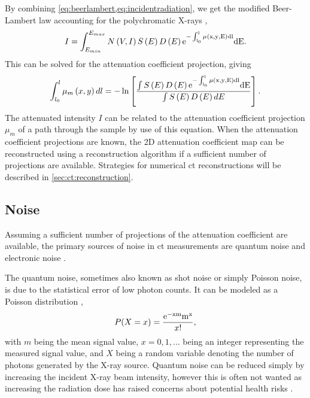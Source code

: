 By combining \cref{eq:beerlambert,eq:incidentradiation}, we get the modified Beer-Lambert law accounting for the polychromatic X-rays \cite{doi:10.1063/1.4950807}, 
\begin{equation}
    I = \int_{E_{min}}^{E_{max}}N\left(V,I\right)S\left(E\right)D\left(E\right)\rm{e}^{-\int_{l_0}^{l}\mu\left(x,y,E\right)dl}dE.
\end{equation}
This can be solved for the attenuation coefficient projection, giving \cite{doi:10.1063/1.4950807}
\begin{equation}
    \label{eq:ctattenuationcoefficient}
    \int_{l_0}^{l} \mu_m\left(x,y\right)dl = -\ln\left[\frac{\int S\left(E\right) D\left(E\right)\rm{e}^{-\int_{l_0}^{l}\mu\left(x,y,E\right)dl} dE }{ \int S\left(E\right) D\left(E\right) dE }\right].
\end{equation}
The attenuated intensity $I$ can be related to the attenuation coefficient projection $\mu_m$ of a path through the sample by use of this equation. When the attenuation coefficient projections are known, the 2D attenuation coefficient map can be reconstructed using a reconstruction algorithm if a sufficient number of projections are available. Strategies for numerical \gls{ct} reconstructions will be described in \cref{sec:ct:reconstruction}.

\subsection{Noise}
Assuming a sufficient number of projections of the attenuation coefficient are available, the primary sources of noise in \gls{ct} measurements are quantum noise and electronic noise \cite{boas2012ct}. 

The quantum noise, sometimes also known as shot noise or simply Poisson noise, is due to the statistical error of low photon counts. It can be modeled as a Poisson distribution \cite{Whiting2006},
\begin{equation}
    \label{eq:poissonnoise}
    P(X = x) = \frac{\rm{e}^{-xm}m^x}{x!},
\end{equation}
with $m$ being the mean signal value, $x=0,1,...$ being an integer representing the measured signal value, and $X$ being a random variable denoting the number of photons generated by the X-ray source. Quantum noise can be reduced simply by increasing the incident X-ray beam intensity, however this is often not wanted as increasing the radiation dose has raised concerns about potential health risks \cite{doi:10.1056/NEJMra072149,PEARCE2012499}. 

